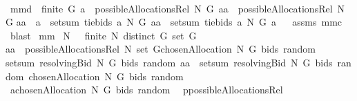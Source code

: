\begin{isabellebody}
%
\endisatagproof
{\isafoldproof}%
%
\isadelimproof
\ \isanewline
%
\endisadelimproof
\isanewline
{}\isamarkupfalse%
\ mm{}{}d{\isacharcolon}\ \ {\isachardoublequoteopen}finite\ G{\isachardoublequoteclose}\ {\isachardoublequoteopen}a\ {\isasymin}\ possibleAllocationsRel\ N\ G{\isachardoublequoteclose}\ {\isachardoublequoteopen}aa\ {\isasymin}\ possibleAllocationsRel\ N\ G{\isachardoublequoteclose}\isanewline
{\isachardoublequoteopen}aa\ {\isasymnoteq}\ a{\isachardoublequoteclose}\ \ {\isachardoublequoteopen}setsum\ {\isacharparenleft}tiebids{\isacharprime}\ a\ N\ G{\isacharparenright}\ aa\ {\isacharless}\ setsum\ {\isacharparenleft}tiebids{\isacharprime}\ a\ N\ G{\isacharparenright}\ a{\isachardoublequoteclose}%
\isadelimproof
\ %
\endisadelimproof
%
\isatagproof
{}\isamarkupfalse%
\ assms\ mm{}{}c\ \isamarkupfalse%
\ blast%
\endisatagproof
{\isafoldproof}%
%
\isadelimproof
%
\endisadelimproof
\isanewline
\isanewline
{}\isamarkupfalse%
\ mm{}{}{\isacharcolon}\ \isanewline
{\isachardoublequoteopen}N\ {\isasymnoteq}\ {\isacharbraceleft}{\isacharbraceright}{\isachardoublequoteclose}\ {\isachardoublequoteopen}finite\ N{\isachardoublequoteclose}\ {\isachardoublequoteopen}distinct\ G{\isachardoublequoteclose}\ {\isachardoublequoteopen}set\ G\ {\isasymnoteq}\ {\isacharbraceleft}{\isacharbraceright}{\isachardoublequoteclose}\isanewline
{\isachardoublequoteopen}aa\ {\isasymin}\ {\isacharparenleft}possibleAllocationsRel\ N\ {\isacharparenleft}set\ G{\isacharparenright}{\isacharparenright}{\isacharminus}{\isacharbraceleft}chosenAllocation{\isacharprime}\ N\ G\ bids\ random{\isacharbraceright}{\isachardoublequoteclose}\ \ \isanewline
{\isachardoublequoteopen}setsum\ {\isacharparenleft}resolvingBid{\isacharprime}\ N\ G\ bids\ random{\isacharparenright}\ aa\ {\isacharless}\ setsum\ {\isacharparenleft}resolvingBid{\isacharprime}\ N\ G\ bids\ random{\isacharparenright}\ {\isacharparenleft}chosenAllocation{\isacharprime}\ N\ G\ bids\ random{\isacharparenright}{\isachardoublequoteclose}\ \isanewline
%
\isadelimproof
%
\endisadelimproof
%
\isatagproof
{}\isamarkupfalse%
\ {\isacharminus}\isanewline
{}\isamarkupfalse%
\ {\isacharquery}a{\isacharequal}{\isachardoublequoteopen}chosenAllocation{\isacharprime}\ N\ G\ bids\ random{\isachardoublequoteclose}\ \isamarkupfalse%
\ {\isacharquery}p{\isacharequal}possibleAllocationsRel\ \isamarkupfalse%

\end{isabellebody}
